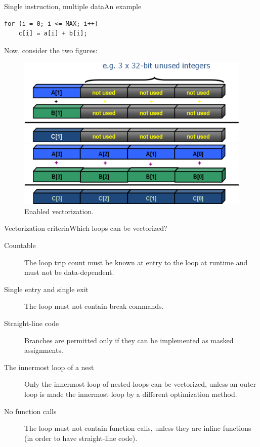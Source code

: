 \documentclass[serif, xcolor={svgnames, table}, usepdftitle=false]{beamer}
\begin{document}
\begin{frame}[fragile]{Single instruction, multiple data}{An example}
\begin{verbatim}
for (i = 0; i <= MAX; i++)
    c[i] = a[i] + b[i];
\end{verbatim}

  Now, consider the two figures:
  \begin{figure}
    \begin{minipage}[b]{0.465\linewidth}
      \centering
      \includegraphics[width=\textwidth]{Registers_Unused.png}
      \caption{Disabled vectorization.}
      \label{fig:a}
    \end{minipage}
    \hspace{0.5cm}
    \begin{minipage}[b]{0.465\linewidth}
      \centering
      \includegraphics[width=\textwidth]{Registers_Used.png}
      \caption{Enabled vectorization.}
      \label{fig:b}
    \end{minipage}
  \end{figure}
\end{frame}

\begin{frame}{Vectorization criteria}{Which loops can be vectorized?}
  \begin{description}
  \item[Countable] The loop trip count must be known at entry to the
    loop at runtime and must not be data-dependent.
  \item[Single entry and single exit] The loop must not contain break
    commands.
  \item[Straight-line code] Branches are permitted only if they can be
    implemented as masked assignments.
  \item[The innermost loop of a nest] Only the innermost loop of nested
    loops can be vectorized, unless an outer loop is made the
    innermost loop by a different optimization method.
  \item[No function calls] The loop must not contain function calls,
    unless they are inline functions (in order to have straight-line
    code).
  \end{description}
\end{frame}
\end{document}
